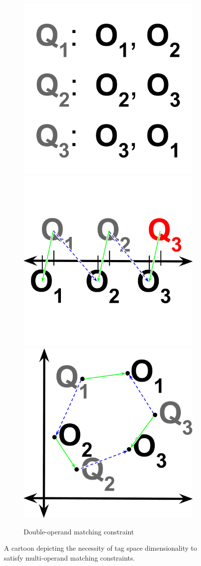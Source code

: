 \begin{figure}[!htbp]
\begin{center}
\begin{subfigure}[b]{\columnwidth}
\centering
\includegraphics[width=0.33\columnwidth]{img/1d-2d-single-double/double}%
\includegraphics[width=0.33\columnwidth]{img/1d-2d-single-double/1d-double}%
\includegraphics[width=0.33\columnwidth]{img/1d-2d-single-double/2d-double}
\caption{
Double-operand matching constraint
}
\label{fig:double}
\end{subfigure}

\caption{
A cartoon depicting the necessity of tag space dimensionality to satisfy multi-operand matching constraints.
}
\label{fig:1d_2d_single_double}

\end{center}
\end{figure}
